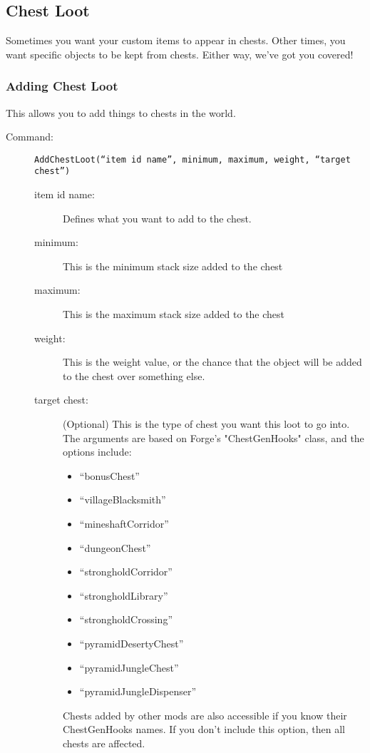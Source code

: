 \documentclass[letterpaper,titlepage,12pt]{article}
\begin{document}
\subsection{Chest Loot}

Sometimes you want your custom items to appear in chests.  Other times, you want specific objects to be kept from chests.  Either way, we've got you covered!

\subsubsection{Adding Chest Loot}

This allows you to add things to chests in the world.

\begin{description}
\item[Command:] \texttt{AddChestLoot(``item id name'', minimum, maximum, weight, ``target chest'')}
\begin{description}
\item [item id name:] Defines what you want to add to the chest.
\item [minimum:] This is the minimum stack size added to the chest
\item [maximum:] This is the maximum stack size added to the chest
\item [weight:] This is the weight value, or the chance that the object will be added to the chest over something else.
\item [target chest:] (Optional) This is the type of chest you want this loot to go into.  The arguments are based on Forge's "ChestGenHooks" class, and the options include:
\begin{multicols}{2}
\begin{itemize}
\item ``bonusChest''
\item ``villageBlacksmith''
\item ``mineshaftCorridor''
\item ``dungeonChest''
\item ``strongholdCorridor''
\item ``strongholdLibrary''
\item ``strongholdCrossing''
\item ``pyramidDesertyChest''
\item ``pyramidJungleChest''
\item ``pyramidJungleDispenser''
\end{itemize}
\end{multicols}

Chests added by other mods are also accessible if you know their ChestGenHooks names.  If you don't include this option, then all chests are affected.
\end{description}
\end{description}
\end{document}
